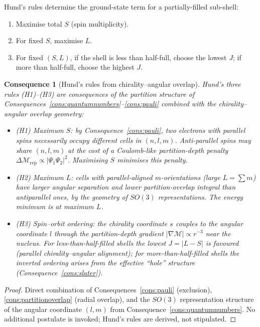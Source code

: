 \documentclass[11pt,twocolumn,a4paper]{article}
\theoremstyle{axiomstyle}
\theoremstyle{conseqstyle}
\newtheorem{consequence}{Consequence}
\theoremstyle{definition}
\theoremstyle{remark}
\newcommand{\Depth}{\mathcal{M}}
\begin{document}
Hund's rules determine the ground-state term for a partially-filled sub-shell:
\begin{enumerate}[label=(H\arabic*)]
\item Maximise total $S$ (spin multiplicity).
\item For fixed $S$, maximise $L$.
\item For fixed $(S,L)$, if the shell is less than half-full, choose the lowest $J$; if more than half-full, choose the highest $J$.
\end{enumerate}
\begin{consequence}[Hund's rules from chirality--angular overlap]\label{cons:hund}
Hund's three rules (H1)--(H3) are consequences of the partition structure of Consequences~\ref{cons:quantumnumbers}--\ref{cons:pauli} combined with the chirality--angular overlap geometry:
\begin{itemize}
\item (H1) Maximum $S$: by Consequence~\ref{cons:pauli}, two electrons with parallel spins necessarily occupy different cells in $(n,l,m)$. Anti-parallel spins may share $(n,l,m)$ at the cost of a Coulomb-like partition-depth penalty $\Delta\Depth_{\mathrm{rep}}\propto |\Psi_{1}\Psi_{2}|^{2}$. Maximising $S$ minimises this penalty.
\item (H2) Maximum $L$: cells with parallel-aligned $m$-orientations (large $L=\sum m$) have larger angular separation and lower partition-overlap integral than antiparallel ones, by the geometry of $SO(3)$ representations. The energy minimum is at maximum $L$.
\item (H3) Spin--orbit ordering: the chirality coordinate $s$ couples to the angular coordinate $l$ through the partition-depth gradient $|\nabla\Depth|\propto r^{-3}$ near the nucleus. For less-than-half-filled shells the lowest $J=|L-S|$ is favoured (parallel chirality--angular alignment); for more-than-half-filled shells the inverted ordering arises from the effective ``hole'' structure (Consequence~\ref{cons:slater}).
\end{itemize}
\end{consequence}

\begin{proof}
Direct combination of Consequences~\ref{cons:pauli} (exclusion), \ref{cons:partitionoverlap} (radial overlap), and the $SO(3)$ representation structure of the angular coordinate $(l,m)$ from Consequence~\ref{cons:quantumnumbers}. No additional postulate is invoked; Hund's rules are derived, not stipulated.
\end{proof}
\end{document}
